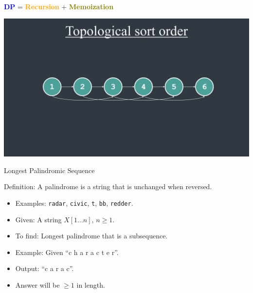 \documentclass{beamer}
\begin{document}
\begin{frame}{ }
    \centering
    \LARGE
    \textcolor{blue}{\textbf{DP}} = \textcolor{orange}{\textbf{Recursion}} + \textcolor{olive}{\textbf{Memoization}}
\end{frame}


\begin{frame}{ }
    \centering
    \includegraphics[width=\textwidth]{figures/topo.png}
\end{frame}

\begin{frame}{Longest Palindromic Sequence}
    \begin{exampleblock}{Definition:}
        A palindrome is a string that is unchanged when reversed.
    \end{exampleblock}
    \begin{itemize}
     \item Examples: \texttt{radar}, \texttt{civic}, \texttt{t}, \texttt{bb}, \texttt{redder}.
     \item Given: A string $X[1 \ldots n]$, $n \geq 1$.
     \item To ﬁnd: Longest palindrome that is a subsequence.
     \item Example: Given ``c h a r a c t e r''.
     \item Output: ``c a r a c''.
     \item Answer will be $\geq 1$ in length.
    \end{itemize}
\end{frame}
\end{document}
